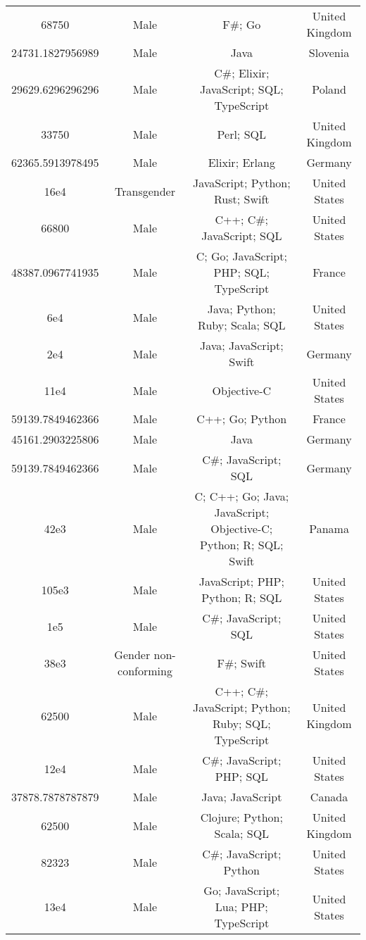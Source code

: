 \begin{center}
\begin{tabular}{ |c|c|c|c| }
68750  &  Male  &  F\#; Go  &  United Kingdom  \\ 
24731.1827956989  &  Male  &  Java  &  Slovenia  \\ 
29629.6296296296  &  Male  &  C\#; Elixir; JavaScript; SQL; TypeScript  &  Poland  \\ 
33750  &  Male  &  Perl; SQL  &  United Kingdom  \\ 
62365.5913978495  &  Male  &  Elixir; Erlang  &  Germany  \\ 
16e4  &  Transgender  &  JavaScript; Python; Rust; Swift  &  United States  \\ 
66800  &  Male  &  C++; C\#; JavaScript; SQL  &  United States  \\ 
48387.0967741935  &  Male  &  C; Go; JavaScript; PHP; SQL; TypeScript  &  France  \\ 
6e4  &  Male  &  Java; Python; Ruby; Scala; SQL  &  United States  \\ 
2e4  &  Male  &  Java; JavaScript; Swift  &  Germany  \\ 
11e4  &  Male  &  Objective-C  &  United States  \\ 
59139.7849462366  &  Male  &  C++; Go; Python  &  France  \\ 
45161.2903225806  &  Male  &  Java  &  Germany  \\ 
59139.7849462366  &  Male  &  C\#; JavaScript; SQL  &  Germany  \\ 
42e3  &  Male  &  C; C++; Go; Java; JavaScript; Objective-C; Python; R; SQL; Swift  &  Panama  \\ 
105e3  &  Male  &  JavaScript; PHP; Python; R; SQL  &  United States  \\ 
1e5  &  Male  &  C\#; JavaScript; SQL  &  United States  \\ 
38e3  &  Gender non-conforming  &  F\#; Swift  &  United States  \\ 
62500  &  Male  &  C++; C\#; JavaScript; Python; Ruby; SQL; TypeScript  &  United Kingdom  \\ 
12e4  &  Male  &  C\#; JavaScript; PHP; SQL  &  United States  \\ 
37878.7878787879  &  Male  &  Java; JavaScript  &  Canada  \\ 
62500  &  Male  &  Clojure; Python; Scala; SQL  &  United Kingdom  \\ 
82323  &  Male  &  C\#; JavaScript; Python  &  United States  \\ 
13e4  &  Male  &  Go; JavaScript; Lua; PHP; TypeScript  &  United States  \\ 

\end{tabular}
\end{center}
